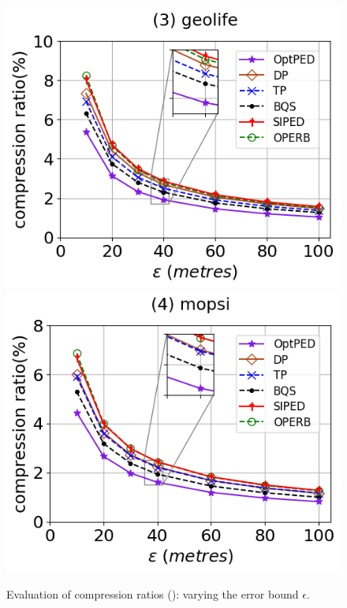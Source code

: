 \begin{figure}[tb!]
	\includegraphics[scale=0.315]{Figures/Exp-PED-CR-epsilon-geolife.png}	\hspace{1ex}
	\includegraphics[scale=0.315]{Figures/Exp-PED-CR-epsilon-mopsi.png}		
	\vspace{-2.5ex}
	\caption{\small Evaluation of compression ratios (\ped): varying the error bound $\epsilon$.}
	\label{fig:cr-ped-epsilon}
	\vspace{-2ex}
\end{figure}


